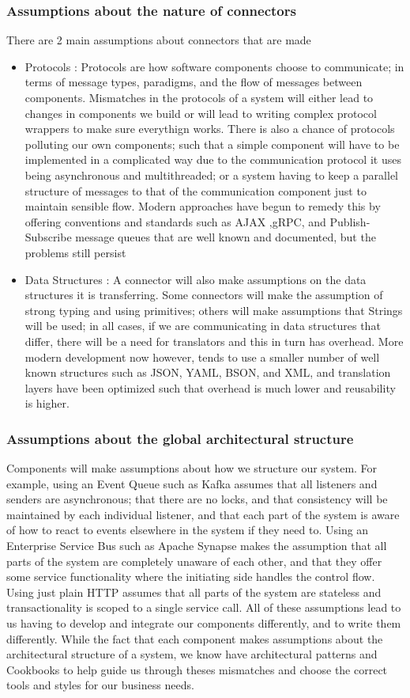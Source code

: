 \documentclass[14pt]{article}
\begin{document}
\subsubsection{Assumptions about the nature of connectors}
There are 2 main assumptions about connectors that are made
\begin{itemize}
  \item Protocols : Protocols are how software components choose to communicate; in terms of message types, paradigms, and the flow of messages between components. Mismatches in the protocols of a system will either lead to changes in components we build or will lead to writing complex protocol wrappers to make sure everythign works. There is also a chance of protocols polluting our own components; such that a simple component will have to be implemented in a complicated way due to the communication protocol it uses being asynchronous and multithreaded; or a system having to keep a parallel structure of messages to that of the communication component just to maintain sensible flow. Modern approaches have begun to remedy this by offering conventions and standards such as AJAX ,gRPC, and Publish-Subscribe message queues that are well known and documented, but the problems still persist 
  \item Data Structures : A connector will also make assumptions on the data structures it is transferring. Some connectors will make the assumption of strong typing and using primitives; others will make assumptions that Strings will be used; in all cases, if we are communicating in data structures that differ, there will be a need for translators and this in turn has overhead. More modern development now however, tends to use a smaller number of well known structures such as JSON, YAML, BSON, and XML, and translation layers have been optimized such that overhead is much lower and reusability is higher.
\end{itemize}
\subsubsection{Assumptions about the global architectural structure}
Components will make assumptions about how we structure our system. For example, using an Event Queue such as Kafka assumes that all
listeners and senders are asynchronous; that there are no locks, and that consistency will be maintained by each individual listener, and 
that each part of the system is aware of how to react to events elsewhere in the system if they need to. 
Using an Enterprise Service Bus such as Apache Synapse makes the assumption that all parts of the system are completely unaware of each other,
and that they offer some service functionality where the initiating side handles the control flow. Using just plain HTTP assumes that all 
parts of the system are stateless and transactionality is scoped to a single service call. All of these assumptions lead to us having 
to develop and integrate our components differently, and to write them differently. While the fact that each component makes assumptions about
the architectural structure of a system, we know have architectural patterns and Cookbooks to help guide us through theses mismatches and choose 
the correct tools and styles for our business needs.
\end{document}
